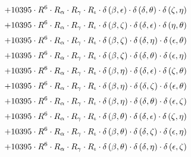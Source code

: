 \begin{subequations}
\begin{gather}
 \\[0.2em] \notag 		 + 10395 \cdot R^{6} \cdot R_{\alpha{}} \cdot R_{\gamma{}} \cdot R_{\iota{}} \cdot \delta{}\left(\beta{}, \epsilon{}\right) \cdot \delta{}\left(\delta{}, \theta{}\right) \cdot \delta{}\left(\zeta{}, \eta{}\right) 
 \\[0.2em] \notag 		 + 10395 \cdot R^{6} \cdot R_{\alpha{}} \cdot R_{\gamma{}} \cdot R_{\iota{}} \cdot \delta{}\left(\beta{}, \zeta{}\right) \cdot \delta{}\left(\delta{}, \epsilon{}\right) \cdot \delta{}\left(\eta{}, \theta{}\right) 
 \\[0.2em] \notag 		 + 10395 \cdot R^{6} \cdot R_{\alpha{}} \cdot R_{\gamma{}} \cdot R_{\iota{}} \cdot \delta{}\left(\beta{}, \zeta{}\right) \cdot \delta{}\left(\delta{}, \eta{}\right) \cdot \delta{}\left(\epsilon{}, \theta{}\right) 
 \\[0.2em] \notag 		 + 10395 \cdot R^{6} \cdot R_{\alpha{}} \cdot R_{\gamma{}} \cdot R_{\iota{}} \cdot \delta{}\left(\beta{}, \zeta{}\right) \cdot \delta{}\left(\delta{}, \theta{}\right) \cdot \delta{}\left(\epsilon{}, \eta{}\right) 
 \\[0.2em] \notag 		 + 10395 \cdot R^{6} \cdot R_{\alpha{}} \cdot R_{\gamma{}} \cdot R_{\iota{}} \cdot \delta{}\left(\beta{}, \eta{}\right) \cdot \delta{}\left(\delta{}, \epsilon{}\right) \cdot \delta{}\left(\zeta{}, \theta{}\right) 
 \\[0.2em] \notag 		 + 10395 \cdot R^{6} \cdot R_{\alpha{}} \cdot R_{\gamma{}} \cdot R_{\iota{}} \cdot \delta{}\left(\beta{}, \eta{}\right) \cdot \delta{}\left(\delta{}, \zeta{}\right) \cdot \delta{}\left(\epsilon{}, \theta{}\right) 
 \\[0.2em] \notag 		 + 10395 \cdot R^{6} \cdot R_{\alpha{}} \cdot R_{\gamma{}} \cdot R_{\iota{}} \cdot \delta{}\left(\beta{}, \eta{}\right) \cdot \delta{}\left(\delta{}, \theta{}\right) \cdot \delta{}\left(\epsilon{}, \zeta{}\right) 
 \\[0.2em] \notag 		 + 10395 \cdot R^{6} \cdot R_{\alpha{}} \cdot R_{\gamma{}} \cdot R_{\iota{}} \cdot \delta{}\left(\beta{}, \theta{}\right) \cdot \delta{}\left(\delta{}, \epsilon{}\right) \cdot \delta{}\left(\zeta{}, \eta{}\right) 
 \\[0.2em] \notag 		 + 10395 \cdot R^{6} \cdot R_{\alpha{}} \cdot R_{\gamma{}} \cdot R_{\iota{}} \cdot \delta{}\left(\beta{}, \theta{}\right) \cdot \delta{}\left(\delta{}, \zeta{}\right) \cdot \delta{}\left(\epsilon{}, \eta{}\right) 
 \\[0.2em] \notag 		 + 10395 \cdot R^{6} \cdot R_{\alpha{}} \cdot R_{\gamma{}} \cdot R_{\iota{}} \cdot \delta{}\left(\beta{}, \theta{}\right) \cdot \delta{}\left(\delta{}, \eta{}\right) \cdot \delta{}\left(\epsilon{}, \zeta{}\right) 

\end{gather}
\end{subequations}
